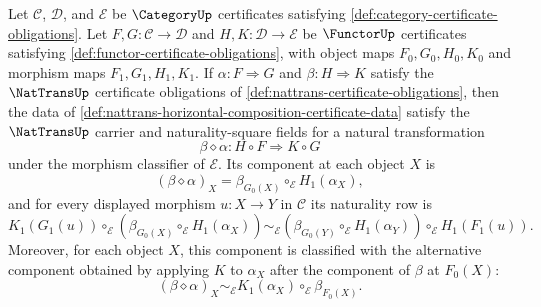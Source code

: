 \begin{theorem}
\label{thm:nattrans-horizontal-composition-certificate}
Let $\mathcal C$, $\mathcal D$, and $\mathcal E$ be $\CategoryUp$ certificates satisfying \autoref{def:category-certificate-obligations}. Let $F,G:\mathcal C\to\mathcal D$ and $H,K:\mathcal D\to\mathcal E$ be $\FunctorUp$ certificates satisfying \autoref{def:functor-certificate-obligations}, with object maps $F_0,G_0,H_0,K_0$ and morphism maps $F_1,G_1,H_1,K_1$. If $\alpha:F\Rightarrow G$ and $\beta:H\Rightarrow K$ satisfy the $\NatTransUp$ certificate obligations of \autoref{def:nattrans-certificate-obligations}, then the data of \autoref{def:nattrans-horizontal-composition-certificate-data} satisfy the $\NatTransUp$ carrier and naturality-square fields for a natural transformation
$$
\beta\diamond\alpha:H\circ F\Rightarrow K\circ G
$$
under the morphism classifier of $\mathcal E$. Its component at each object $X$ is
$$
(\beta\diamond\alpha)_X=\beta_{G_0(X)}\circ_{\mathcal E}H_1(\alpha_X),
$$
and for every displayed morphism $u:X\to Y$ in $\mathcal C$ its naturality row is
$$
K_1(G_1(u))\circ_{\mathcal E}(\beta_{G_0(X)}\circ_{\mathcal E}H_1(\alpha_X))
\sim_{\mathcal E}
(\beta_{G_0(Y)}\circ_{\mathcal E}H_1(\alpha_Y))\circ_{\mathcal E}H_1(F_1(u)).
$$
Moreover, for each object $X$, this component is classified with the alternative component obtained by applying $K$ to $\alpha_X$ after the component of $\beta$ at $F_0(X)$:
$$
(\beta\diamond\alpha)_X
\sim_{\mathcal E}
K_1(\alpha_X)\circ_{\mathcal E}\beta_{F_0(X)}.
$$
\end{theorem}
